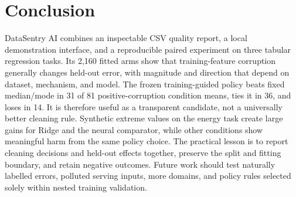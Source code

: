 \documentclass[conference]{IEEEtran}
\begin{document}
\section{Conclusion}
DataSentry AI combines an inspectable CSV quality report, a local demonstration interface, and a reproducible paired experiment on three tabular regression tasks. Its 2,160 fitted arms show that training-feature corruption generally changes held-out error, with magnitude and direction that depend on dataset, mechanism, and model. The frozen training-guided policy beats fixed median/mode in 31 of 81 positive-corruption condition means, ties it in 36, and loses in 14. It is therefore useful as a transparent candidate, not a universally better cleaning rule. Synthetic extreme values on the energy task create large gains for Ridge and the neural comparator, while other conditions show meaningful harm from the same policy choice. The practical lesson is to report cleaning decisions and held-out effects together, preserve the split and fitting boundary, and retain negative outcomes. Future work should test naturally labelled errors, polluted serving inputs, more domains, and policy rules selected solely within nested training validation.




\end{document}
